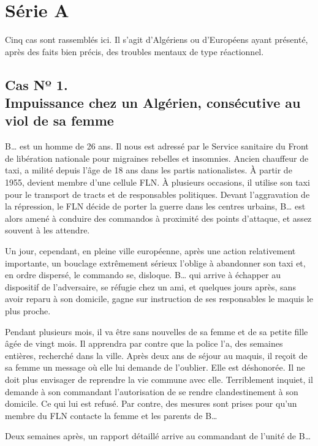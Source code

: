 \documentclass[french,twoside]{book} %
\begin{document}
 \section[{Série A}]{Série A}
\noindent Cinq cas sont rassemblés ici. Il s’agit d’Algériens ou d’Européens ayant présenté, après des faits bien précis, des troubles mentaux de type réactionnel.\par
\subsection[{Cas Nº 1. Impuissance chez un Algérien, consécutive au viol de sa femme}]{Cas Nº 1. \\
Impuissance chez un Algérien, consécutive au viol de sa femme}
\noindent B… est un homme de 26 ans. Il nous est adressé par le Service sanitaire du Front de libération nationale pour migraines rebelles et insomnies. Ancien chauffeur de taxi, a milité depuis l’âge de 18 ans dans les partis nationalistes. À partir de 1955, devient membre d’une cellule FLN. À plusieurs occasions, il utilise son taxi pour le transport de tracts et de responsables politiques. Devant l’aggravation de la répression, le FLN décide de porter la guerre dans les centres urbains, B… est alors amené à conduire des commandos à proximité des points d’attaque, et assez souvent à les attendre.\par
Un jour, cependant, en pleine ville européenne, après une action relativement importante, un bouclage extrêmement sérieux l’oblige à abandonner son taxi et, en ordre dispersé, le commando se, disloque. B… qui arrive à échapper au dispositif de l’adversaire, se réfugie chez un ami, et quelques jours après, sans avoir reparu à son domicile, gagne sur instruction de ses responsables le maquis le plus proche.\par
Pendant plusieurs mois, il va être sans nouvelles de sa femme et de sa petite fille âgée de vingt mois. Il apprendra par contre que la police l’a, des semaines entières, recherché dans la   ville. Après deux ans de séjour au maquis, il reçoit de sa femme un message où elle lui demande de l’oublier. Elle est déshonorée. Il ne doit plus envisager de reprendre la vie commune avec elle. Terriblement inquiet, il demande à son commandant l’autorisation de se rendre clandestinement à son domicile. Ce qui lui est refusé. Par contre, des mesures sont prises pour qu’un membre du FLN contacte la femme et les parents de B…\par
Deux semaines après, un rapport détaillé arrive au commandant de l’unité de B…\par
\end{document}
